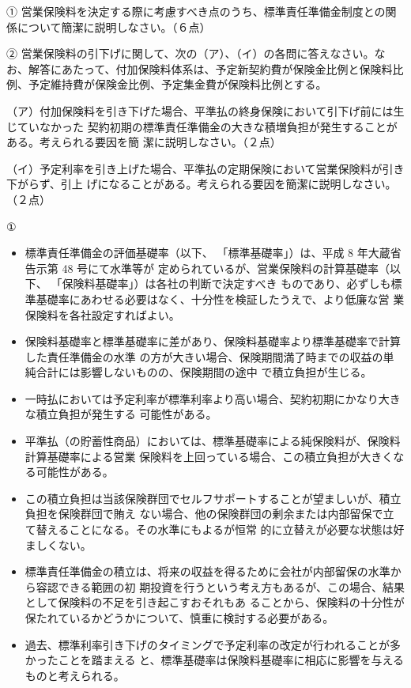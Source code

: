 \documentclass[report,gutter=10mm,fore-edge=10mm,uplatex,dvipdfmx]{jlreq}
\begin{document}
① 営業保険料を決定する際に考慮すべき点のうち、標準責任準備金制度との関係について簡潔に説明しなさい。（６点）

② 営業保険料の引下げに関して、次の（ア）、（イ）の各問に答えなさい。なお、解答にあたって、付加保険料体系は、予定新契約費が保険金比例と保険料比例、予定維持費が保険金比例、予定集金費が保険料比例とする。

（ア）付加保険料を引き下げた場合、平準払の終身保険において引下げ前には生じていなかった
契約初期の標準責任準備金の大きな積増負担が発生することがある。考えられる要因を簡
潔に説明しなさい。（２点）

（イ）予定利率を引き上げた場合、平準払の定期保険において営業保険料が引き下がらず、引上
げになることがある。考えられる要因を簡潔に説明しなさい。（２点）


①
\begin{itemize}
 \item  標準責任準備金の評価基礎率（以下、
 「標準基礎率」）は、平成 8 年大蔵省告示第 48 号にて水準等が
 定められているが、営業保険料の計算基礎率（以下、
 「保険料基礎率」）は各社の判断で決定すべき
 ものであり、必ずしも標準基礎率にあわせる必要はなく、十分性を検証したうえで、より低廉な営
 業保険料を各社設定すればよい。
 \item  保険料基礎率と標準基礎率に差があり、保険料基礎率より標準基礎率で計算した責任準備金の水準
 の方が大きい場合、保険期間満了時までの収益の単純合計には影響しないものの、保険期間の途中
 で積立負担が生じる。
 \item  一時払においては予定利率が標準利率より高い場合、契約初期にかなり大きな積立負担が発生する
 可能性がある。
 \item  平準払（の貯蓄性商品）においては、標準基礎率による純保険料が、保険料計算基礎率による営業
 保険料を上回っている場合、この積立負担が大きくなる可能性がある。
 \item  この積立負担は当該保険群団でセルフサポートすることが望ましいが、積立負担を保険群団で賄え
 ない場合、他の保険群団の剰余または内部留保で立て替えることになる。その水準にもよるが恒常
 的に立替えが必要な状態は好ましくない。
 \item  標準責任準備金の積立は、将来の収益を得るために会社が内部留保の水準から容認できる範囲の初
 期投資を行うという考え方もあるが、この場合、結果として保険料の不足を引き起こすおそれもあ
 ることから、保険料の十分性が保たれているかどうかについて、慎重に検討する必要がある。
 \item  過去、標準利率引き下げのタイミングで予定利率の改定が行われることが多かったことを踏まえる
 と、標準基礎率は保険料基礎率に相応に影響を与えるものと考えられる。
\end{itemize}
\end{document}
